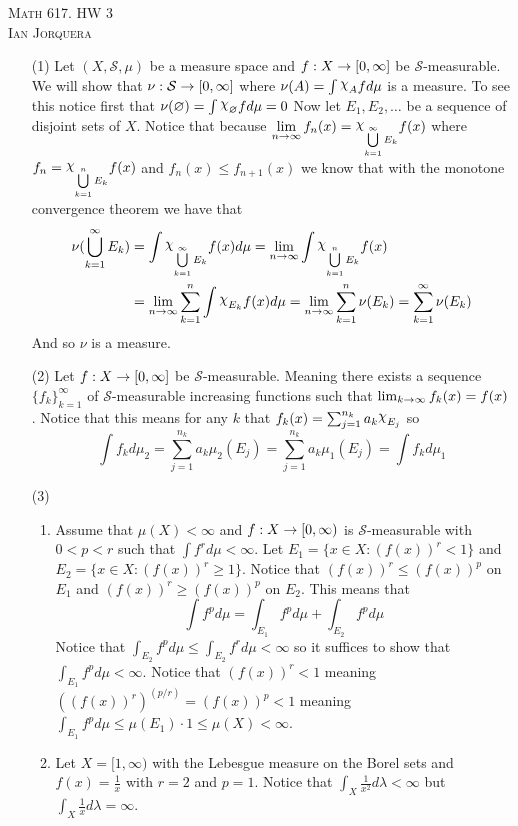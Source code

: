 \documentclass[12pt]{amsart}
\DeclareRobustCommand{\rchi}{{\mathpalette\irchi\relax}}
\newcommand{\irchi}[2]{\raisebox{\depth}{$#1\chi$}} %
\begin{document}
\begin{center}
   \textsc{Math 617. HW 3\\ Ian Jorquera}
\end{center}
\vspace{1em}

\begin{itemize}
   \item[(1)] Let $(X,\mathcal S,\mu)$ be a measure space and $f:X\rightarrow [0,\infty]$ be 
   $\mathcal S$-measurable. We will show that $\nu:\mathcal S\rightarrow [0,\infty]$ where 
   $\nu(A)=\int \rchi_{A}f d\mu$ is a measure.
   To see this notice first that $\nu(\emptyset)=\int \rchi_{\emptyset}f d\mu= 0$
   Now let $E_1,E_2,\dots$ be a sequence of disjoint sets of $X$. Notice that because 
   $\lim\limits_{n\ra\infty}f_n(x)=\rchi_{\bigcup\limits_{k=1}^\infty E_k}f(x)$ where $f_n=\rchi_{\bigcup\limits_{k=1}^n E_k}f(x)$ and
   $f_n(x)\leq f_{n+1}(x)$ we know that with the monotone convergence theorem we have that
   \begin{align*}
      \nu(\bigcup_{k=1}^{\infty} E_k)&=\int \rchi_{\bigcup\limits_{k=1}^\infty E_k}f(x)d\mu=\lim_{n\ra\infty}\int\rchi_{\bigcup\limits_{k=1}^n E_k}f(x)\\
      &=\lim_{n\ra\infty}\sum_{k=1}^n\int\rchi_{E_k}f(x)d\mu=\lim_{n\ra\infty}\sum_{k=1}^n\nu(E_k)=\sum_{k=1}^\infty\nu(E_k)
   \end{align*}
   And so $\nu$ is a measure.


   \item[(2)] Let $f:X\rightarrow[0,\infty]$ be $\mathcal S$-measurable. Meaning there exists a sequence 
   $\{f_k\}_{k=1}^\infty$ of $\mathcal S$-measurable increasing functions such that $\lim_{k\rightarrow \infty}f_k(x)=f(x)$.
   Notice that this means for any $k$ that $f_k(x)=\sum_{j=1}^{n_k}a_{k}\rchi_{E_j}$ so 
   \[\int f_k d\mu_2=\sum_{j=1}^{n_k}a_{k}\mu_2({E_j})=\sum_{j=1}^{n_k}a_{k}\mu_1({E_j})=\int f_k d\mu_1\]


   \item[(3)]
   \begin{enumerate}[label= (\alph*)]
      \item Assume that $\mu(X)<\infty$ and $f:X\rightarrow [0,\infty)$ is $\mathcal S$-measurable with $0<p<r$ such that 
      $\int f^rd\mu<\infty$. Let $E_1=\{x\in X : (f(x))^r< 1\}$ and $E_2=\{x\in X : (f(x))^r\geq 1\}$.
      Notice that $(f(x))^r\leq (f(x))^p$ on $E_1$ and $(f(x))^r\geq (f(x))^p$ on $E_2$. This means 
      that
      \[\int f^pd\mu =\int_{E_1} f^pd\mu+\int_{E_2} f^pd\mu\]
      Notice that $\int_{E_2} f^pd\mu\leq \int_{E_2} f^rd\mu<\infty$ so it suffices to show that $\int_{E_1} f^pd\mu<\infty$.
      Notice that $(f(x))^r<1$ meaning $((f(x))^r)^{(p/r)}=(f(x))^p<1$ meaning 
      $\int_{E_1} f^pd\mu\leq\mu(E_1)\cdot 1\leq\mu(X)<\infty$.
      \item Let $X=[1,\infty)$ with the Lebesgue measure on the Borel sets and 
      $f(x)=\frac{1}{x}$ with $r=2$ and $p=1$. Notice that $\int_X\frac{1}{x^2}d\lambda<\infty$ but
      $\int_X\frac{1}{x}d\lambda=\infty$.



\end{enumerate}
\end{itemize}
\end{document}

